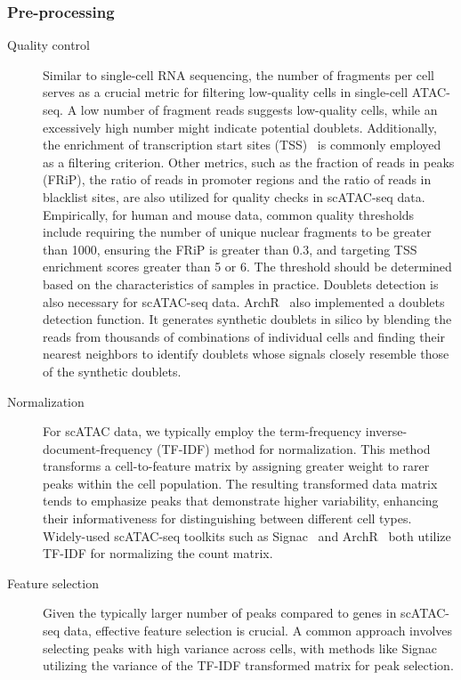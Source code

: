\subsubsection{Pre-processing}
\begin{description}
	\item[Quality control]
	Similar to single-cell RNA sequencing, the number of fragments per cell serves as a crucial metric for filtering low-quality cells in single-cell ATAC-seq. A low number of fragment reads suggests low-quality cells, while an excessively high number might indicate potential doublets. Additionally, the enrichment of transcription start sites (TSS)~\citep{Granja2021} is commonly employed as a filtering criterion. Other metrics, such as the fraction of reads in peaks (FRiP), the ratio of reads in promoter regions and the ratio of reads in blacklist sites, are also utilized for quality checks in scATAC-seq data. Empirically, for human and mouse data, common quality thresholds include requiring the number of unique nuclear fragments to be greater than 1000, ensuring the FRiP is greater than 0.3, and targeting TSS enrichment scores greater than 5 or 6. The threshold should be determined based on the characteristics of samples in practice. Doublets detection is also necessary for scATAC-seq data. ArchR~\citep{Granja2021} also implemented a doublets detection function. It generates synthetic doublets in silico by blending the reads from thousands of combinations of individual cells and finding their nearest neighbors to identify doublets whose signals closely resemble those of the synthetic doublets.

	\item[Normalization]
	For scATAC data, we typically employ the term-frequency inverse-document-frequency (TF-IDF) method for normalization. This method transforms a cell-to-feature
	matrix by assigning greater weight to rarer peaks within the cell population. The resulting transformed data matrix tends to emphasize peaks that demonstrate higher variability, enhancing their informativeness for distinguishing between different cell types. Widely-used scATAC-seq toolkits such as Signac~\citep{signac} and ArchR~\citep{granja2019single} both utilize TF-IDF for normalizing the count matrix.


	\item[Feature selection]
	Given the typically larger number of peaks compared to genes in scATAC-seq data, effective feature selection is crucial. A common approach involves selecting peaks with high variance across cells, with methods like Signac~\citep{signac} utilizing the variance of the TF-IDF transformed matrix for peak selection.
\end{description}
